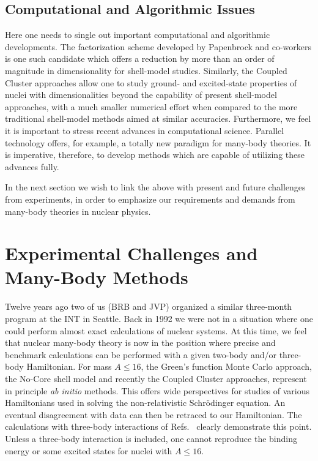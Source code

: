 \documentclass[12pt]{iopart}
\begin{document}
\subsection{Computational and Algorithmic Issues}

Here one needs to single out important computational and 
algorithmic developments.  The factorization scheme developed 
by Papenbrock and co-workers is one such candidate
which offers a reduction by more than an order of magnitude in dimensionality 
for shell-model studies. Similarly, the Coupled Cluster approaches
allow one to study ground- and excited-state properties of nuclei
with dimensionalities beyond the capability of present shell-model
approaches, with a much smaller numerical effort when compared to
the more traditional shell-model methods aimed at similar accuracies.
Furthermore, we feel it is important to stress recent advances 
in computational science.
Parallel technology offers, for example, a totally new paradigm
for many-body theories. It is imperative, therefore, 
to develop methods which are capable
of utilizing these advances fully.  

In the next section we wish to link the above 
with present and future challenges
from experiments, in order to emphasize our 
requirements and demands from 
many-body theories in nuclear physics.

\section{Experimental Challenges and Many-Body Methods} 

Twelve years ago two of us (BRB and JVP) organized 
a similar three-month program
at the INT in Seattle. Back in 1992 we were 
not in a situation where one could perform
almost exact calculations of nuclear systems.
At this time, we feel that nuclear many-body theory is now in the position
where precise and benchmark calculations can be performed with a given
two-body and/or three-body Hamiltonian. 
For mass $A\le 16$, the Green's function Monte Carlo
approach, the No-Core shell model and recently the Coupled 
Cluster approaches,
represent in principle {\it ab initio} methods. 
This offers wide perspectives for studies
of various Hamiltonians used in  solving the 
non-relativistic Schr\"odinger
equation. An eventual disagreement with data can 
then be retraced to our Hamiltonian.
The calculations with three-body interactions of 
Refs.~\cite{bobsteve1,erichpetr} clearly demonstrate this 
point. Unless a three-body interaction is included, one 
cannot  reproduce the binding energy or some excited states for nuclei with 
$A\le 16$. 
\end{document}
